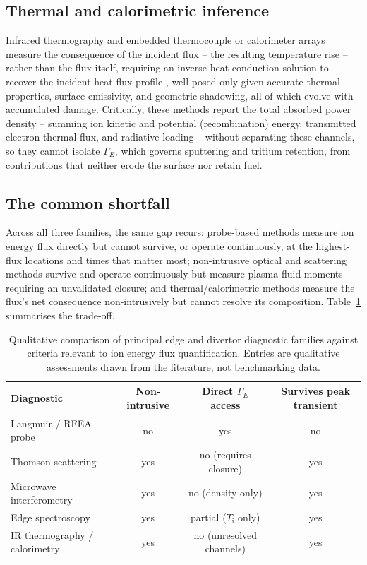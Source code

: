 \subsection{Thermal and calorimetric inference}

Infrared thermography and embedded thermocouple or calorimeter arrays measure the consequence of the incident flux -- the resulting temperature rise -- rather than the flux itself, requiring an inverse heat-conduction solution to recover the incident heat-flux profile \cite{ref0175}, well-posed only given accurate thermal properties, surface emissivity, and geometric shadowing, all of which evolve with accumulated damage. Critically, these methods report the total absorbed power density -- summing ion kinetic and potential (recombination) energy, transmitted electron thermal flux, and radiative loading -- without separating these channels, so they cannot isolate $\Gamma_{E}$, which governs sputtering and tritium retention, from contributions that neither erode the surface nor retain fuel.

\subsection{The common shortfall}

Across all three families, the same gap recurs: probe-based methods measure ion energy flux directly but cannot survive, or operate continuously, at the highest-flux locations and times that matter most; non-intrusive optical and scattering methods survive and operate continuously but measure plasma-fluid moments requiring an unvalidated closure; and thermal/calorimetric methods measure the flux's net consequence non-intrusively but cannot resolve its composition. Table~\ref{ch18-tab:diagnostics} summarises the trade-off.

\begin{table}[htbp]
\centering
\caption{Qualitative comparison of principal edge and divertor diagnostic families against criteria relevant to ion energy flux quantification. Entries are qualitative assessments drawn from the literature, not benchmarking data.}
\label{ch18-tab:diagnostics}
\begin{tabular}{@{}lccc@{}}
\toprule
Diagnostic & Non-intrusive & Direct $\Gamma_{E}$ access & Survives peak transient \\
\midrule
Langmuir / RFEA probe \cite{ref0610} & no & yes & no \\
Thomson scattering \cite{ref0383} & yes & no (requires closure) & yes \\
Microwave interferometry \cite{ref0399} & yes & no (density only) & yes \\
Edge spectroscopy & yes & partial ($T_{\mathrm{i}}$ only) & yes \\
IR thermography / calorimetry \cite{ref0175} & yes & no (unresolved channels) & yes \\
\bottomrule
\end{tabular}
\end{table}

